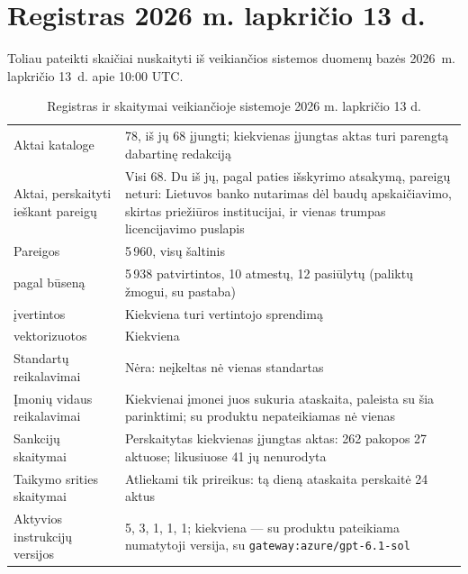 \section{Registras 2026 m. lapkričio 13 d.}\label{sec:obligations:state}

Toliau pateikti skaičiai nuskaityti iš veikiančios sistemos duomenų bazės 2026~m. lapkričio 13~d. apie
10:00 UTC.

\begin{table}[H]
\caption{Registras ir skaitymai veikiančioje sistemoje 2026 m. lapkričio 13 d.}\label{tab:obligations:state}
\begin{tabularx}{\textwidth}{@{}L{52mm}Y@{}}
\toprule
{} &  \\
\midrule
Aktai kataloge & 78, iš jų 68 įjungti; kiekvienas įjungtas aktas turi parengtą dabartinę redakciją \\
Aktai, perskaityti ieškant pareigų & Visi 68. Du iš jų, pagal paties išskyrimo atsakymą, pareigų neturi: Lietuvos banko nutarimas dėl baudų apskaičiavimo, skirtas priežiūros institucijai, ir vienas trumpas licencijavimo puslapis \\
Pareigos & 5\,960, visų šaltinis  \\
\quad pagal būseną & 5\,938 patvirtintos, 10 atmestų, 12 pasiūlytų (paliktų žmogui, su pastaba) \\
\quad įvertintos & Kiekviena turi vertintojo sprendimą \\
\quad vektorizuotos & Kiekviena \\
Standartų reikalavimai & Nėra: neįkeltas nė vienas standartas \\
Įmonių vidaus reikalavimai & Kiekvienai įmonei juos sukuria ataskaita, paleista su šia parinktimi; su produktu nepateikiamas nė vienas \\
Sankcijų skaitymai & Perskaitytas kiekvienas įjungtas aktas: 262 pakopos 27 aktuose; likusiuose 41 jų nenurodyta \\
Taikymo srities skaitymai & Atliekami tik prireikus: tą dieną ataskaita perskaitė 24 aktus \\
Aktyvios instrukcijų versijos &  5,  3,  1,  1,  1; kiekviena --- su produktu pateikiama numatytoji versija, su \texttt{gateway:azure/gpt-6.1-sol} \\
\bottomrule
\end{tabularx}
\end{table}

